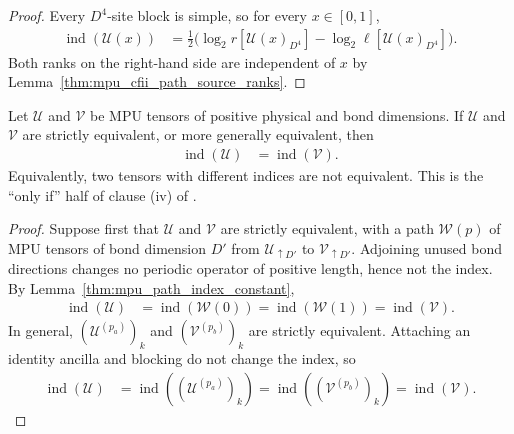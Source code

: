 \begin{proof}\leanok
    Every $D^4$-site block is simple, so for every $x\in[0,1]$,
    \begin{align}
        \operatorname{ind}(\mathcal U(x))
         & =\frac12\bigl(\log_2 r[\mathcal U(x)_{D^4}]
        -\log_2\ell[\mathcal U(x)_{D^4}]\bigr).
    \end{align}
    Both ranks on the right-hand side are independent of $x$ by
    Lemma~\ref{thm:mpu_cfii_path_source_ranks}.
\end{proof}

\begin{lemma}
    \label{thm:mpu_equivalence_index_eq}
    \leanok
    Let $\mathcal U$ and $\mathcal V$ be MPU tensors of positive physical and
    bond dimensions. If $\mathcal U$ and $\mathcal V$ are strictly equivalent,
    or more generally equivalent, then
    \begin{align}
        \operatorname{ind}(\mathcal U) & =\operatorname{ind}(\mathcal V).
    \end{align}
    Equivalently, two tensors with different indices are not equivalent.
    This is the ``only if'' half of clause (iv) of
    \cite[Theorem~IV.6]{Cirac2017MPU}.
\end{lemma}

\begin{proof}\leanok
    Suppose first that $\mathcal U$ and $\mathcal V$ are strictly equivalent,
    with a path $\mathcal W(p)$ of MPU tensors of bond dimension $D'$ from
    $\mathcal U_{\uparrow D'}$ to $\mathcal V_{\uparrow D'}$. Adjoining unused
    bond directions changes no periodic operator of positive length, hence
    not the index. By Lemma~\ref{thm:mpu_path_index_constant},
    \begin{align}
        \operatorname{ind}(\mathcal U)
         & =\operatorname{ind}(\mathcal W(0))
        =\operatorname{ind}(\mathcal W(1))
        =\operatorname{ind}(\mathcal V).
    \end{align}
    In general, $(\mathcal U^{(p_a)})_k$ and $(\mathcal V^{(p_b)})_k$ are
    strictly equivalent. Attaching an identity ancilla and blocking do not
    change the index, so
    \begin{align}
        \operatorname{ind}(\mathcal U)
         & =\operatorname{ind}((\mathcal U^{(p_a)})_k)
        =\operatorname{ind}((\mathcal V^{(p_b)})_k)
        =\operatorname{ind}(\mathcal V).
    \end{align}
\end{proof}

